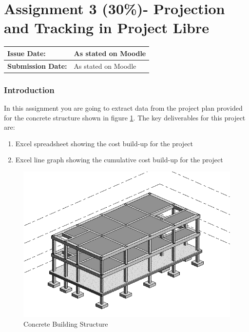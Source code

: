 
	

\part*{Assignment 3 (30\%)- Projection and Tracking in Project Libre}


\begin{tabularx}{\textwidth}{ |X|X| }
	\hline
	\textbf{Issue Date:} & As stated on Moodle \\
	\hline 
	\textbf{Submission Date:}  & As stated on Moodle  \\
	\hline
\end{tabularx}

\section*{Introduction}

In this assignment you are going to extract data from the project plan provided for the concrete structure shown in figure \ref{fig:building}.  The key deliverables for this project are:

\begin{enumerate}
	\item Excel spreadsheet showing the cost build-up for the project 
	\item Excel line graph showing the cumulative cost build-up for the project 
\end{enumerate}


\begin{figure}[b]
	\centering
	\includegraphics[width=1.0\linewidth]{Building}
	\caption{Concrete Building Structure}
	\label{fig:building}
\end{figure}




